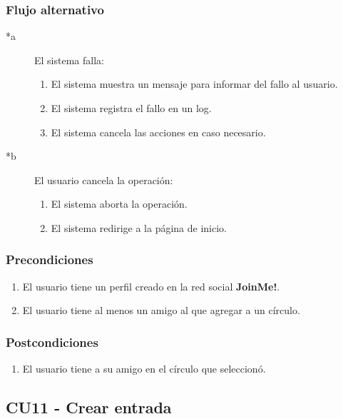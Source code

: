 \documentclass[12pt, a4paper, titlepage]{article}
\begin{document}
\subsubsection{Flujo alternativo}

	\begin{description}
	\item [*a] El sistema falla:
		\begin{enumerate}
			\item El sistema muestra un mensaje para informar del fallo al usuario.
			\item El sistema registra el fallo en un log.
			\item El sistema cancela las acciones en caso necesario.
		\end{enumerate}
	\end{description}

	\begin{description}
		\item [*b] El usuario cancela la operación:
		\begin{enumerate}
			\item El sistema aborta la operación.
			\item El sistema redirige a la página de inicio.
		\end{enumerate}
	\end{description}

\subsubsection{Precondiciones}
	\begin{enumerate}
		\item El usuario tiene un perfil creado en la red social \textbf{JoinMe!}.
		\item El usuario tiene al menos un amigo al que agregar a un círculo.
	\end{enumerate}

\subsubsection{Postcondiciones}
	\begin{enumerate}
		\item El usuario tiene a su amigo en el círculo que seleccionó.
	\end{enumerate}


\subsection{CU11 - Crear entrada}
\end{document}
